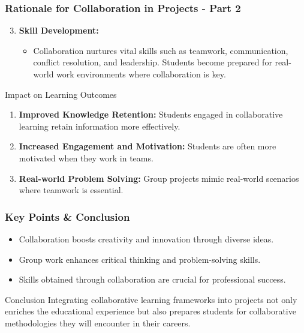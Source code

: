 \documentclass[aspectratio=169]{beamer}
\begin{document}
\begin{frame}[fragile]
    \frametitle{Rationale for Collaboration in Projects - Part 2}
    \begin{enumerate}
        \setcounter{enumi}{2}
        \item \textbf{Skill Development:}
        \begin{itemize}
            \item Collaboration nurtures vital skills such as teamwork, communication, conflict resolution, and leadership. Students become prepared for real-world work environments where collaboration is key.
        \end{itemize}
    \end{enumerate}

    \begin{block}{Impact on Learning Outcomes}
        \begin{enumerate}
            \item \textbf{Improved Knowledge Retention:} Students engaged in collaborative learning retain information more effectively.
            \item \textbf{Increased Engagement and Motivation:} Students are often more motivated when they work in teams.
            \item \textbf{Real-world Problem Solving:} Group projects mimic real-world scenarios where teamwork is essential.
        \end{enumerate}
    \end{block}
\end{frame}

\begin{frame}[fragile]
    \frametitle{Key Points & Conclusion}
    \begin{itemize}
        \item Collaboration boosts creativity and innovation through diverse ideas.
        \item Group work enhances critical thinking and problem-solving skills.
        \item Skills obtained through collaboration are crucial for professional success.
    \end{itemize}
    
    \begin{block}{Conclusion}
        Integrating collaborative learning frameworks into projects not only enriches the educational experience but also prepares students for collaborative methodologies they will encounter in their careers.
    \end{block}
\end{frame}
\end{document}
